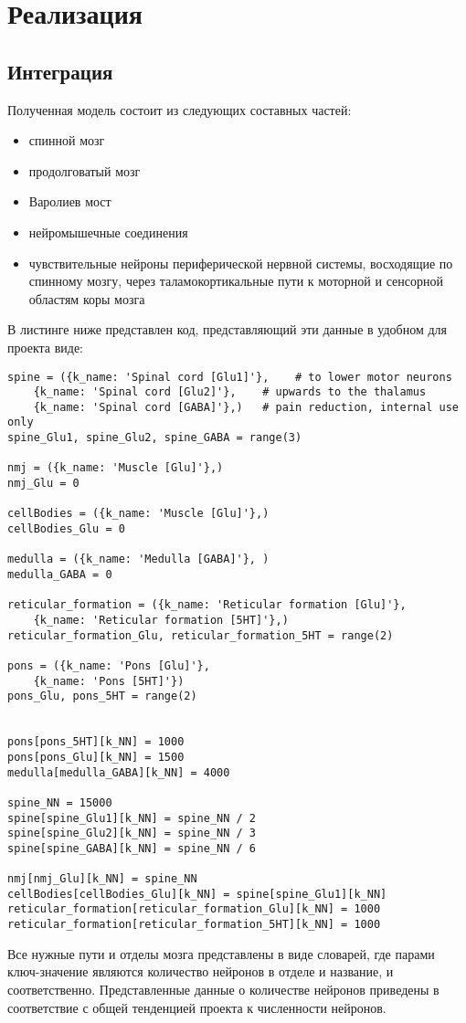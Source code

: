 \chapter{Реализация}
\label{chap:implementation}
\section{Интеграция}
Полученная модель состоит из следующих составных частей:
\begin{itemize}
	\item спинной мозг
	\item продолговатый мозг
	\item Варолиев мост
	\item нейромышечные соединения
	\item чувствительные нейроны периферической нервной системы, восходящие по спинному мозгу, через таламокортикальные пути к моторной и сенсорной областям коры мозга
\end{itemize}

В листинге ниже представлен код, представляющий эти данные в удобном для проекта  виде: 
\begin{lstlisting}
spine = ({k_name: 'Spinal cord [Glu1]'},    # to lower motor neurons
	{k_name: 'Spinal cord [Glu2]'},    # upwards to the thalamus
	{k_name: 'Spinal cord [GABA]'},)   # pain reduction, internal use only
spine_Glu1, spine_Glu2, spine_GABA = range(3)

nmj = ({k_name: 'Muscle [Glu]'},)
nmj_Glu = 0

cellBodies = ({k_name: 'Muscle [Glu]'},)
cellBodies_Glu = 0

medulla = ({k_name: 'Medulla [GABA]'}, )
medulla_GABA = 0

reticular_formation = ({k_name: 'Reticular formation [Glu]'},
	{k_name: 'Reticular formation [5HT]'},)
reticular_formation_Glu, reticular_formation_5HT = range(2)

pons = ({k_name: 'Pons [Glu]'},
	{k_name: 'Pons [5HT]'})
pons_Glu, pons_5HT = range(2)


pons[pons_5HT][k_NN] = 1000
pons[pons_Glu][k_NN] = 1500
medulla[medulla_GABA][k_NN] = 4000

spine_NN = 15000
spine[spine_Glu1][k_NN] = spine_NN / 2
spine[spine_Glu2][k_NN] = spine_NN / 3
spine[spine_GABA][k_NN] = spine_NN / 6

nmj[nmj_Glu][k_NN] = spine_NN
cellBodies[cellBodies_Glu][k_NN] = spine[spine_Glu1][k_NN]
reticular_formation[reticular_formation_Glu][k_NN] = 1000
reticular_formation[reticular_formation_5HT][k_NN] = 1000
\end{lstlisting}
Все нужные пути и отделы мозга представлены в виде словарей, где парами ключ-значение являются количество нейронов в отделе и название,  и  соответственно. 
Представленные данные о количестве нейронов приведены в соответствие с общей тенденцией проекта к численности нейронов.

